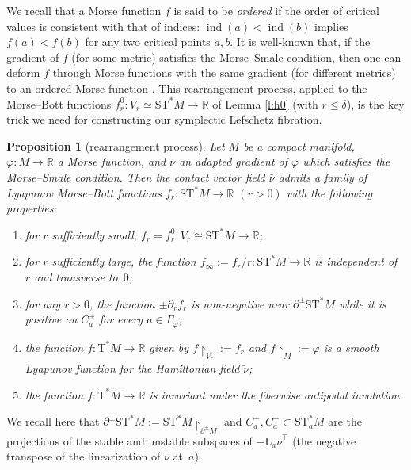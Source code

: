 \documentclass[10pt]{amsart}
\newcommand{\R}{{\mathbb R}}
\newcommand{\Crit}{\Gamma_{\!\varphi}}
\newcommand{\ind}{\operatorname{ind}}
\newcommand{\tu}[1]{\textup{#1}}
\newcommand{\sT}{\mathrm{T}^\ast}
\newcommand{\sST}{\mathrm{ST}^\ast}
\newcommand{\hnu}{\tilde\nu}
\newcommand{\cnu}{\bar\nu}
\def\Lnu_#1{{\mathrm L_#1\nu}}
\newcommand{\de}{\mathrel{:=}}
\newcommand{\rst}[1]{{\upharpoonright}_{\!#1}}
\let\del\partial
\let\on\colon
\theoremstyle{plain}
\newtheorem{proposition}[theorem]{Proposition}
\theoremstyle{definition}
\begin{document}
We recall that a Morse function $f$ is said to be \emph{ordered} if the order of
critical values is consistent with that of indices: $\ind(a) < \ind(b)$ implies
$f(a) < f(b)$ for any two critical points $a, b$. It is well-known that, if the
gradient of $f$ (for some metric) satisfies the Morse--Smale condition, then
one can deform $f$ through Morse functions with the same gradient (for different
metrics) to an ordered Morse function \cite[Th.\,B]{Sm}. This rearrangement
process, applied to the Morse--Bott functions $f_r^0 \on V_r \simeq \sST M \to
\R$ of Lemma \ref{l:h0} (with $r \le \delta$), is the key trick we need for
constructing our symplectic Lefschetz fibration.

\begin{proposition}[rearrangement process] \label{p:f}
Let $M$ be a compact manifold, \hbox{$\varphi \on M\!\to\! \R$} a Morse function, and
$\nu$ an adapted gradient of $\varphi$ which satisfies the Morse--Smale condition.
Then the contact vector field $\cnu$ admits a family of Lyapunov Morse--Bott
functions $f_r \on \sST M \to \R$ $(r>0)$ with the following properties\tu:
\begin{enumerate}
\item\label{p:f1}
for $r$ sufficiently small, $f_r = f_r^0 \on V_r \cong \sST M \to \R$\tu;
\item\label{p:f2}
for $r$ sufficiently large, the function $f_\infty \de f_r/r \on \sST M \to \R$
is independent of $r$ and transverse to~$0$\tu;
\item\label{p:f3}
for any $r>0$, the function $\pm\del_rf_r$ is non-negative near $\del^\pm\sST M$
while it is positive on $C_a^\pm$ for every $a \in \Crit$\tu;
\item\label{p:f4}
the function $f \on \sT M \to \R$ given by $f \rst{ V_r } \de f_r$ and $f \rst M
\de \varphi$ is a smooth Lyapunov function for the Hamiltonian field $\hnu$\tu;
\item\label{p:f5}
the function $f \on \sT M \to \R$ is invariant under the fiberwise antipodal
involution.
\end{enumerate}
\end{proposition}

We recall here that $\del^\pm \sST M \de \sST M \rst{ \del^\pm M }$ and $C_a^-,
C_a^+ \subset \sST_aM$ are the projections of the stable and unstable subspaces
of $-\Lnu_a^\top$ (the negative transpose of the linearization of $\nu$ at~$a$).
\end{document}
